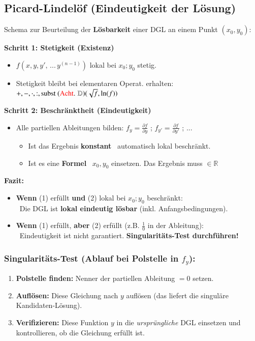 \subsection{Picard-Lindelöf (Eindeutigkeit der Lösung)}

Schema zur Beurteilung der \textbf{Lösbarkeit} einer DGL an einem Punkt $(x_0, y_0)$:

\medskip
\textbf{Schritt 1: Stetigkeit (Existenz)}
\begin{itemize}
    \item[(1)] $f(x, y, y', \, ... \, y^{(n-1)} )$ lokal bei $x_0 ; y_0$ stetig.
    \item[] Stetigkeit bleibt bei elementaren Operat. erhalten: $+, -, \cdot, :, \text{subst ({\color{red}Acht}. }\mathbb{D}) (\sqrt{f}, \ln(f))$\\
\end{itemize}

\textbf{Schritt 2: Beschränktheit (Eindeutigkeit)}
\begin{itemize}
    \item[(2)] Alle partiellen Ableitungen bilden: $f_y = \frac{\partial f}{\partial y}$ ; $f_{y'} = \frac{\partial f}{\partial y'}$ ; ...
    \begin{itemize}
        \item Ist das Ergebnis \textbf{konstant} \textrightarrow\ automatisch lokal beschränkt.
        \item Ist es eine \textbf{Formel} \textrightarrow\ $x_0, y_0$ einsetzen. 
        Das Ergebnis muss $\in \mathbb{R}$
    \end{itemize}
\end{itemize}

\medskip
\textbf{Fazit:}
\begin{itemize}
    \item \textbf{Wenn} (1) erfüllt \textbf{und} (2) lokal bei $x_0 ; y_0$ beschränkt: \\
    \textrightarrow\ Die DGL ist \textbf{lokal eindeutig lösbar} (inkl. Anfangsbedingungen).
    \item \textbf{Wenn} (1) erfüllt, \textbf{aber} (2)  erfüllt (z.B. $\frac{1}{0}$ in der Ableitung): \\
    \textrightarrow\ Eindeutigkeit ist nicht garantiert. \textbf{Singularitäts-Test durchführen!}
\end{itemize}

\medskip
\subsubsection{Singularitäts-Test (Ablauf bei Polstelle in $f_y$):}
\begin{enumerate}
    \item \textbf{Polstelle finden:} Nenner der partiellen Ableitung $= 0$ setzen.
    \item \textbf{Auflösen:} Diese Gleichung nach $y$ auflösen (das liefert die singuläre Kandidaten-Lösung).
    \item \textbf{Verifizieren:} Diese Funktion $y$ in die \textit{ursprüngliche} DGL einsetzen und kontrollieren, ob die Gleichung erfüllt ist.
\end{enumerate}

